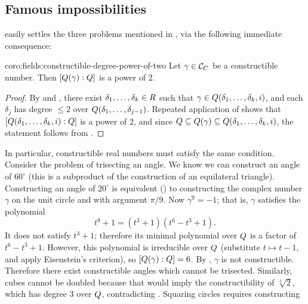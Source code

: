 \subsection{Famous impossibilities}%
\label{subsec:fields:famous-impossibilities}
 easily settles the three problems mentioned in
, via
the following immediate consequence:
\begin{coro}{}{coro:fields:constructible-degree-power-of-two}
  Let $\gamma \in \mathcal{C}_{C}$ be a constructible number. Then
  $[Q(\gamma) : Q]$ is a power of $2$.
\end{coro}
\begin{proof}
  By  and , there exist
  $\delta_1, \dots, \delta_k \in R$ such that
  $\gamma \in Q(\delta_1, \dots, \delta_k, i)$, and each $\delta_j$
  has degree $\leq 2$ over $Q(\delta_1, \dots,
  \delta_{j-1})$. Repeated application of 
  shows that $[Q(\delta_1, \dots, \delta_k, i) : Q]$ is a power of
  $2$, and since
  $Q \subseteq Q(\gamma) \subseteq Q(\delta_1, \dots, \delta_k,
  i)$, the statement follows from .
\end{proof}
In particular, constructible real numbers must satisfy the same
condition.  Consider the problem of trisecting an angle. We know we
can construct an angle of $60^\circ$ (this is a subproduct of the
construction of an equilateral triangle). Constructing an angle of
$20^\circ$ is equivalent
() to
constructing the complex number $\gamma$ on the unit circle and with
argument $\pi/9$. Now $\gamma^9 = -1$; that is, $\gamma$ satisfies the
polynomial
\[
  t^9 + 1 = (t^3 + 1)(t^6 - t^3 + 1).
\]
It does not satisfy $t^3 + 1$; therefore its minimal polynomial over
$Q$ is a factor of $t^6 - t^3 + 1$. However, this polynomial is
irreducible over $Q$ (substitute $t \mapsto t-1$, and apply
Eisenstein's criterion), so $[Q(\gamma) : Q] = 6$. By
, $\gamma$ is not constructible. Therefore there
exist constructible angles which cannot be trisected.  Similarly,
cubes cannot be doubled because that would imply the constructibility
of $\sqrt[3]{2}$, which has degree $3$ over $Q$, contradicting
. Squaring circles requires constructing
